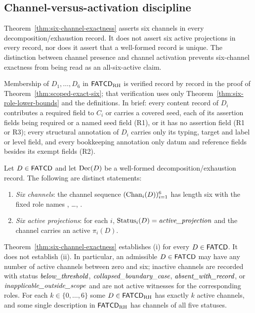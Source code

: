 \subsection{Channel-versus-activation discipline}\label{subsec:channel-vs-activation}

Theorem~\ref{thm:six-channel-exactness} asserts six channels in every
decomposition/exhaustion record. It does not assert six active
projections in every record, nor does it assert that a well-formed
record is unique. The distinction between channel presence and
channel activation prevents six-channel exactness from being read as
an all-six-active claim.

Membership of \(D_1,\dots,D_6\) in \(\mathsf{FATCD}_{\mathrm{RH}}\) is verified record by
record in the proof of Theorem~\ref{thm:scoped-exact-six}; that verification
uses only Theorem~\ref{thm:six-role-lower-bounds} and the definitions. In brief:
every content record of \(D_i\) contributes a required field to \(C_i\) or
carries a covered seed, each of its assertion fields being required or a named
seed field (R1), or it has no assertion field (R1 or R3); every structural
annotation of \(D_i\) carries only its typing, target and label or level field,
and every bookkeeping annotation only datum and reference fields besides its
exempt fields (R2).

\begin{proposition}\label{prop:channel-vs-activation}
Let \(D \in \mathsf{FATCD}{}\) and let \(\operatorname{Dec}\!\left(D\right)\) be a well-formed decomposition/exhaustion
record. The following are distinct statements:
\begin{enumerate}[label=(\roman*),topsep=2pt,itemsep=1pt]
  \item \emph{Six channels}: the channel sequence
    \((\operatorname{Chan}_{i}\!\left(D\right))_{i=1}^{6}\) has length six with the fixed role names
    \Pone{}, \ldots, \Psix{}.
  \item \emph{Six active projections}: for each \(i\),
    \(\operatorname{Status}_{i}\!\left(D\right) = \textit{active\_\allowbreak projection}\) and the channel carries an active
    \(\pi_i(D)\).
\end{enumerate}
Theorem~\ref{thm:six-channel-exactness} establishes (i) for every
\(D \in \mathsf{FATCD}{}\). It does not establish (ii). In particular, an
admissible \(D \in \mathsf{FATCD}{}\) may have any number of active channels
between zero and six; inactive channels are recorded with status
\(\textit{below\_\allowbreak threshold}\), \(\textit{collapsed\_\allowbreak boundary\_\allowbreak case}\), \(\textit{absent\_\allowbreak with\_\allowbreak record}\), or \(\textit{inapplicable\_\allowbreak outside\_\allowbreak scope}\)
and are not active witnesses for the corresponding roles. For each
\(k\in\{0,\dots,6\}\) some \(D\in\mathsf{FATCD}_{\mathrm{RH}}\) has exactly \(k\) active
channels, and some single description in \(\mathsf{FATCD}_{\mathrm{RH}}\) has channels of all
five statuses.
\end{proposition}

